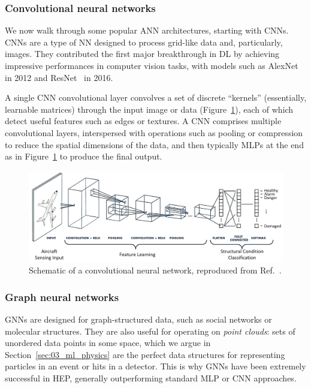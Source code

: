 \subsubsection{Convolutional neural networks}

We now walk through some popular ANN architectures, starting with CNNs.
CNNs are a type of NN designed to process grid-like data and, particularly, images.
They contributed the first major breakthrough in DL by achieving impressive performances in computer vision tasks, with models such as AlexNet~\cite{krizhevsky2012imagenet} in 2012 and ResNet~\cite{he2016deep} in 2016.

A single CNN convolutional layer convolves a set of discrete ``kernels'' (essentially, learnable matrices) through the input image or data (Figure~\ref{fig:03_ml_cnn}), each of which detect useful features such as edges or textures.
A CNN comprises multiple convolutional layers, interspersed with operations such as pooling or compression to reduce the spatial dimensions of the data, and then typically MLPs at the end as in Figure~\ref{fig:03_ml_cnn} to produce the final output.

\begin{figure}[ht]
    \centering
    \includegraphics[width=\textwidth]{figures/06-ML4Jets/equivariantnns/sensors-19-04933-g001.png}
    \caption{Schematic of a convolutional neural network, reproduced from Ref.~\cite{iuliana2019convolutional}.}
    \label{fig:03_ml_cnn}
\end{figure}


\subsubsection{Graph neural networks}

GNNs are designed for graph-structured data, such as social networks or molecular structures.
They are also useful for operating on \textit{point clouds}: sets of unordered data points in some space, which we argue in Section~\ref{sec:03_ml_physics} are the perfect data structures for representing particles in an event or hits in a detector.
This is why GNNs have been extremely successful in HEP, generally outperforming standard MLP or CNN approaches.

